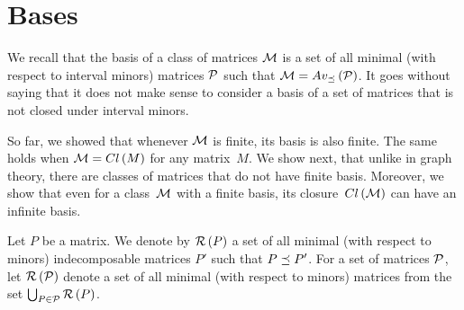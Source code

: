 \section{Bases}
We recall that the basis of a class of matrices $\mathcal{M}$ is a set of all minimal (with respect to interval minors) matrices $\mathcal{P}$ such that $\mathcal{M}=Av_{\preceq}\left(\mathcal{P}\right)$. It goes without saying that it does not make sense to consider a basis of a set of matrices that is not closed under interval minors.

So far, we showed that whenever $\mathcal{M}$ is finite, its basis is also finite. The same holds when $\mathcal{M}=Cl\left(M\right)$ for any matrix~$M$. We show next, that unlike in graph theory, there are classes of matrices that do not have finite basis. Moreover, we show that even for a class~$\mathcal{M}$ with a finite basis, its closure~$Cl\left(\mathcal{M}\right)$ can have an infinite basis.

\begin{defn}
Let $P$ be a matrix. We denote by $\mathcal{R}\left(P\right)$ a set of all minimal (with respect to minors) indecomposable matrices $P'$ such that $P\preceq P'$. For a set of matrices $\mathcal{P}$, let $\mathcal{R}\left(\mathcal{P}\right)$ denote a set of all minimal (with respect to minors) matrices from the set $\bigcup_{P\in\mathcal{P}}\mathcal{R}\left(P\right)$.
\end{defn}

